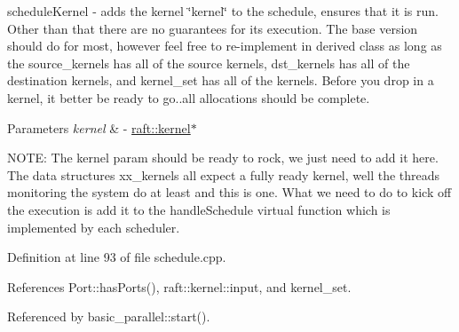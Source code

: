 schedule\+Kernel -\/ adds the kernel \char`\"{}kernel\char`\"{} to the schedule, ensures that it is run. Other than that there are no guarantees for its execution. The base version should do for most, however feel free to re-\/implement in derived class as long as the source\+\_\+kernels has all of the source kernels, dst\+\_\+kernels has all of the destination kernels, and kernel\+\_\+set has all of the kernels. Before you drop in a kernel, it better be ready to go..all allocations should be complete. 
\begin{DoxyParams}{Parameters}
{\em kernel} & -\/ \hyperlink{classraft_1_1kernel}{raft\+::kernel}$\ast$ \\
\hline
\end{DoxyParams}
N\+O\+TE\+: The kernel param should be ready to rock, we just need to add it here. The data structures xx\+\_\+kernels all expect a fully ready kernel, well the threads monitoring the system do at least and this is one. What we need to do to kick off the execution is add it to the handle\+Schedule virtual function which is implemented by each scheduler.

Definition at line 93 of file schedule.\+cpp.



References Port\+::has\+Ports(), raft\+::kernel\+::input, and kernel\+\_\+set.



Referenced by basic\+\_\+parallel\+::start().


